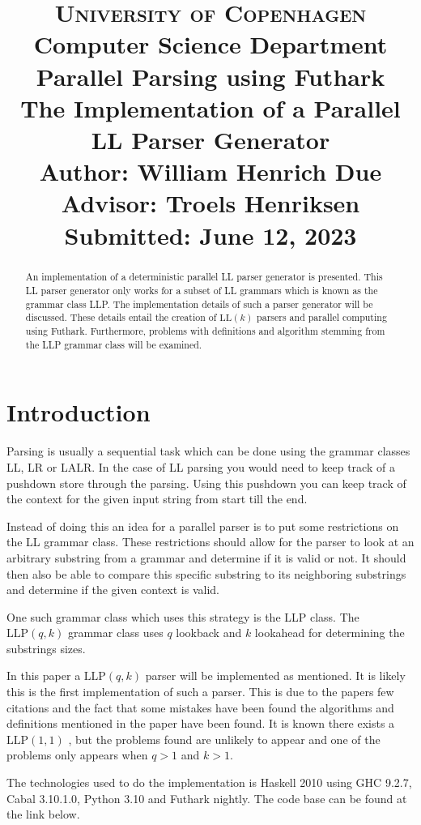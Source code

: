 \documentclass[a4paper,12pt]{article}
\title{
    {\Large \textsc{University of Copenhagen}} \\[0pt]
    {\large Computer Science Department} \\[10pt]
    {\Large Parallel Parsing using Futhark} \\[4pt]
    {\large The Implementation of a Parallel LL Parser Generator} \\[10pt]
    Author: William Henrich Due \\[0pt]
    Advisor: Troels Henriksen \\[0pt]
    Submitted: June 12, 2023
}
\author{}
\date{}
\newcommand\LL{\text{LL}}
\newcommand\LLP{\text{LLP}}
\theoremstyle{definition}
\begin{document}
\maketitle
\thispagestyle{firstpage}
\begin{abstract}
\noindent An implementation of a deterministic parallel LL parser generator is presented. This LL parser generator only works for a subset of LL grammars which is known as the grammar class LLP. The implementation details of such a parser generator will be discussed. These details entail the creation of $\LL(k)$ parsers and parallel computing using Futhark. Furthermore, problems with definitions and algorithm stemming from the LLP grammar class will be examined.
\end{abstract}

\tableofcontents

\section{Introduction}
Parsing is usually a sequential task which can be done using the grammar classes LL, LR or LALR. In the case of LL parsing you would need to keep track of a pushdown store through the parsing. Using this pushdown you can keep track of the context for the given input string from start till the end.

Instead of doing this an idea for a parallel parser is to put some restrictions on the LL grammar class. These restrictions should allow for the parser to look at an arbitrary substring from a grammar and determine if it is valid or not. It should then also be able to compare this specific substring to its neighboring substrings and determine if the given context is valid.

One such grammar class which uses this strategy is the LLP class. The $\LLP(q, k)$ grammar class uses $q$ lookback and $k$ lookahead for determining the substrings sizes.

In this paper a $\LLP(q, k)$ parser will be implemented as mentioned. It is likely this is the first implementation of such a parser. This is due to the papers few citations and the fact that some mistakes have been found the algorithms and definitions mentioned in the paper have been found. It is known there exists a $\LLP(1, 1)$ \cite{voetter2021}, but the problems found are unlikely to appear and one of the problems only appears when $q > 1$ and $k > 1$.

The technologies used to do the implementation is Haskell 2010 using GHC 9.2.7, Cabal 3.10.1.0, Python 3.10 and Futhark nightly. The code base can be found at the link below. \newline
\end{document}
